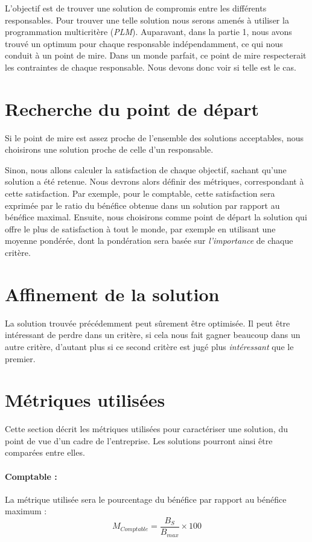 
L'objectif est de trouver une solution de compromis entre les différents responsables.
Pour trouver une telle solution nous serons amenés à utiliser la programmation multicritère (\emph{PLM}).
Auparavant, dans la partie 1, nous avons trouvé un optimum pour chaque
responsable indépendam\-ment, ce qui nous conduit à un point de mire. Dans un
monde parfait, ce point de mire respecterait les contraintes de chaque
responsable. Nous devons donc voir si telle est le cas. 

\section{Recherche du point de départ}
Si le point de mire est assez proche de l'ensemble des solutions acceptables,
nous choisirons une solution proche de celle d'un responsable.

Sinon, nous allons calculer la satisfaction de chaque objectif, sachant qu'une
solution a été retenue. Nous devrons alors définir des métriques, correspondant
à cette satisfaction. Par exemple, pour le comptable, cette satisfaction sera
exprimée par le ratio du bénéfice obtenue dans un solution par rapport au
bénéfice maximal.
Ensuite, nous choisirons comme point de départ la solution qui offre le plus de
satisfaction à tout le monde, par exemple en utilisant une moyenne pondérée,
dont la pondération sera basée sur \emph{l'importance} de chaque critère.

\section{Affinement de la solution}
La solution trouvée précédemment peut sûrement être optimisée. Il peut être
intéressant de perdre dans un critère, si cela nous fait gagner beaucoup dans
un autre critère, d'autant plus si ce second critère est jugé plus
\emph{intéressant} que le premier.

\section{Métriques utilisées}
Cette section décrit les métriques utilisées pour caractériser une solution, du
point de vue d'un cadre de l'entreprise. Les solutions pourront ainsi être
comparées entre elles.

\paragraph{Comptable :}
La métrique utilisée sera le pourcentage du bénéfice par rapport au bénéfice
maximum :
$$
M_{Comptable} = \frac{B_{S}}{B_{max}} \times 100
$$

